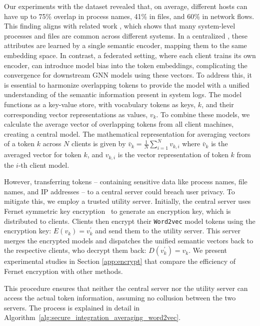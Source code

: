 Our experiments with the \optc dataset revealed that, on average, different hosts can have up to 75\% overlap in process names, 41\% in files, and 60\% in network flows. This finding aligns with related work \cite{flash2024}, which shows that many system-level processes and files are common across different systems. In a centralized \pids, these attributes are learned by a single semantic encoder, mapping them to the same embedding space. In contrast, a federated setting, where each client trains its own encoder, can introduce model bias into the token embeddings, complicating the convergence for downstream GNN models using these vectors. To address this, it is essential to harmonize overlapping tokens to provide the model with a unified understanding of the semantic information present in system logs. 
The \wordvec model functions as a key-value store, with vocabulary tokens as keys, \(k\), and their corresponding vector representations as values, \(v_k\). To combine these models, we calculate the average vector of overlapping tokens from all client machines, creating a central model. The mathematical representation for averaging vectors of a token \(k\) across \(N\) clients is given by \(\bar{v}_k = \frac{1}{N}\sum_{i=1}^{N} v_{k,i}\) where \(\bar{v}_k\) is the averaged vector for token \(k\), and \(v_{k,i}\) is the vector representation of token \(k\) from the \(i\)-th client model.

However, transferring tokens -- containing sensitive data like process names, file names, and IP addresses -- to a central server could breach user privacy. To mitigate this, we employ a trusted utility server. Initially, the central server uses Fernet symmetric key encryption~\cite{ismail2020fernet,bokhari2016review} to generate an encryption key, which is distributed to clients. Clients then encrypt their \texttt{Word2vec} model tokens using the encryption key: \( E(v_{k}) = v_{k}^{'} \) and send them to the utility server. This server merges the encrypted models and dispatches the unified semantic vectors back to the respective clients, who decrypt them back: \( D(v_{k}^{'}) = v_{k} \). We present experimental studies in Section \ref{app:encrypt} that compare the efficiency of Fernet encryption with other methods.

This procedure ensures that neither the central server nor the utility server can access the actual token information, assuming no collusion between the two servers. The process is explained in detail in Algorithm~\ref{alg:secure_integration_averaging_word2vec}.

